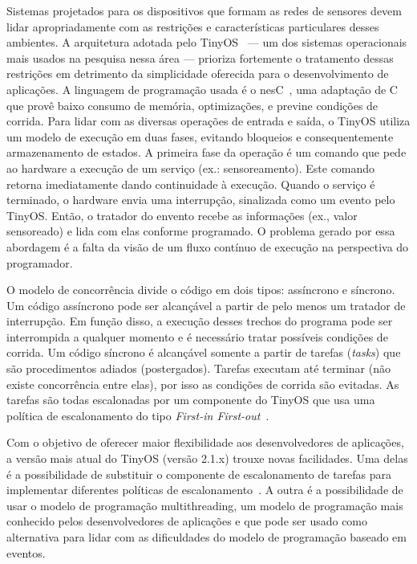 \documentclass[a4paper,onecolumn, 10pt]{article}
\begin{document}
Sistemas projetados para os dispositivos que formam as redes de sensores devem lidar apropriadamente
com as restrições e características particulares desses ambientes. 
A arquitetura adotada pelo TinyOS~\cite{tinyos/00} --- um dos sistemas operacionais mais usados
na pesquisa nessa área --- prioriza fortemente o tratamento dessas restrições em 
detrimento da simplicidade oferecida para o desenvolvimento de aplicações. 
A linguagem de programação usada é o nesC~\cite{nesc/03}, uma adaptação de C que provê baixo 
consumo de memória, optimizações, e previne condições de corrida.
Para lidar com as diversas operações de entrada e saída, o TinyOS utiliza um modelo de 
execução em duas fases, evitando bloqueios e consequentemente armazenamento de estados. 
A primeira fase da operação é um comando que pede ao hardware a execução de um serviço 
(ex.: sensoreamento). Este comando retorna imediatamente dando continuidade à execução. Quando o
serviço é terminado, o hardware envia uma interrupção, sinalizada como um evento pelo TinyOS. 
Então, o tratador do envento recebe as informações (ex., valor sensoreado) e lida com elas conforme programado. 
O problema gerado por essa abordagem é a falta da visão de um fluxo contínuo de execução 
na perspectiva do programador. 

O modelo de concorrência divide o código em dois tipos: assíncrono e síncrono. 
Um código  assíncrono pode ser alcançável a partir de pelo menos
um tratador de interrupção. Em função disso, a execução desses trechos do programa pode ser interrompida
a qualquer momento e é necessário tratar possíveis condições de corrida.
Um código síncrono é alcançável somente a partir de tarefas (\textit{tasks}) que são 
procedimentos adiados (postergados). Tarefas executam até terminar (não existe concorrência entre elas), 
por isso as condições de corrida são evitadas.  
As tarefas são todas escalonadas por um componente do TinyOS que usa uma política de escalonamento 
do tipo \textit{First-in First-out}~\cite{LevisGay/09}.

Com o objetivo de oferecer maior flexibilidade aos desenvolvedores de aplicações, 
a versão mais atual do TinyOS (versão 2.1.x) trouxe novas facilidades.
Uma delas é a possibilidade de substituir o componente de escalonamento de tarefas
para implementar diferentes políticas de escalonamento~\cite{TEP106}.
A outra é a possibilidade de usar o modelo de programação multithreading,
um modelo de programação mais conhecido pelos desenvolvedores de aplicações e que pode
ser usado como alternativa para lidar com as dificuldades do modelo de programação baseado em eventos.
\end{document}
